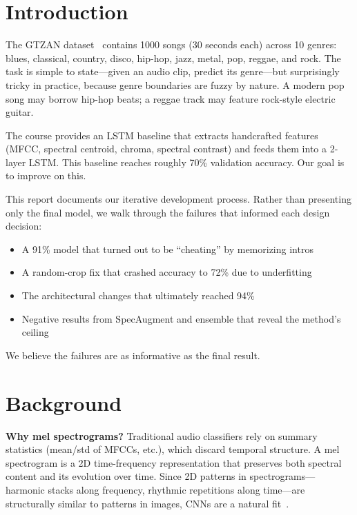 \section{Introduction}

The GTZAN dataset~\cite{tzanetakis2002musical} contains 1000 songs (30 seconds each) across 10 genres: blues, classical, country, disco, hip-hop, jazz, metal, pop, reggae, and rock. The task is simple to state---given an audio clip, predict its genre---but surprisingly tricky in practice, because genre boundaries are fuzzy by nature. A modern pop song may borrow hip-hop beats; a reggae track may feature rock-style electric guitar.

The course provides an LSTM baseline that extracts handcrafted features (MFCC, spectral centroid, chroma, spectral contrast) and feeds them into a 2-layer LSTM. This baseline reaches roughly 70\% validation accuracy. Our goal is to improve on this.

This report documents our iterative development process. Rather than presenting only the final model, we walk through the failures that informed each design decision:
\begin{itemize}
  \item A 91\% model that turned out to be ``cheating'' by memorizing intros
  \item A random-crop fix that crashed accuracy to 72\% due to underfitting
  \item The architectural changes that ultimately reached 94\%
  \item Negative results from SpecAugment and ensemble that reveal the method's ceiling
\end{itemize}

We believe the failures are as informative as the final result.

\section{Background}

\textbf{Why mel spectrograms?}
Traditional audio classifiers rely on summary statistics (mean/std of MFCCs, etc.), which discard temporal structure. A mel spectrogram is a 2D time-frequency representation that preserves both spectral content and its evolution over time. Since 2D patterns in spectrograms---harmonic stacks along frequency, rhythmic repetitions along time---are structurally similar to patterns in images, CNNs are a natural fit~\cite{choi2016automatic, dieleman2014end}.

